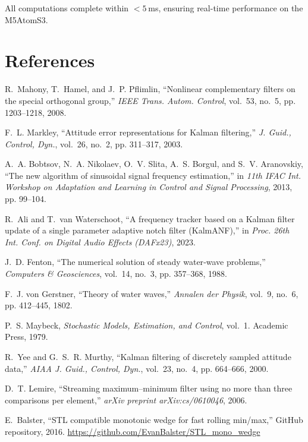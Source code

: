 \documentclass[12pt]{article}
\begin{document}
All computations complete within \(<5\) ms, ensuring real-time performance on the M5AtomS3.

\section*{References}
\begin{thebibliography}{10}

R.~Mahony, T.~Hamel, and J.~P. Pflimlin, “Nonlinear complementary filters on the special orthogonal group,” \emph{IEEE Trans. Autom. Control}, vol.~53, no.~5, pp. 1203–1218, 2008.

F.~L. Markley, “Attitude error representations for Kalman filtering,” \emph{J. Guid., Control, Dyn.}, vol.~26, no.~2, pp. 311–317, 2003.

A.~A. Bobtsov, N.~A. Nikolaev, O.~V. Slita, A.~S. Borgul, and S.~V. Aranovskiy, “The new algorithm of sinusoidal signal frequency estimation,” in \emph{11th IFAC Int. Workshop on Adaptation and Learning in Control and Signal Processing}, 2013, pp. 99–104.

R.~Ali and T.~van Waterschoot, “A frequency tracker based on a Kalman filter update of a single parameter adaptive notch filter (KalmANF),” in \emph{Proc. 26th Int. Conf. on Digital Audio Effects (DAFx23)}, 2023.

J.~D. Fenton, “The numerical solution of steady water‐wave problems,” \emph{Computers \& Geosciences}, vol.~14, no.~3, pp. 357–368, 1988.

F.~J. von Gerstner, “Theory of water waves,” \emph{Annalen der Physik}, vol.~9, no.~6, pp. 412–445, 1802.

P.~S. Maybeck, \emph{Stochastic Models, Estimation, and Control}, vol.~1. Academic Press, 1979.

R.~Yee and G.~S.~R. Murthy, “Kalman filtering of discretely sampled attitude data,” \emph{AIAA J. Guid., Control, Dyn.}, vol.~23, no.~4, pp. 664–666, 2000.

D.~T. Lemire, “Streaming maximum–minimum filter using no more than three comparisons per element,” \emph{arXiv preprint arXiv:cs/0610046}, 2006.

E.~Balster, “STL compatible monotonic wedge for fast rolling min/max,” GitHub repository, 2016. \url{https://github.com/EvanBalster/STL_mono_wedge}

\end{thebibliography}
\end{document}
